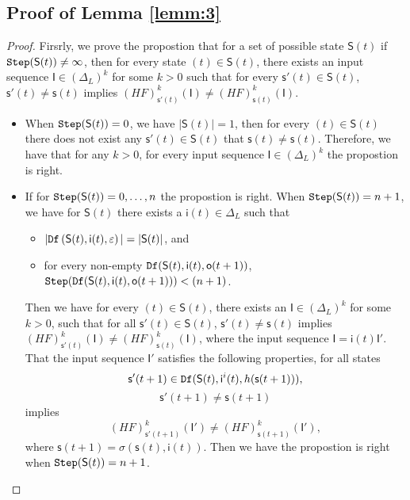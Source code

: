 \begin{appendices}
\subsection{Proof of Lemma \ref{lemm:3}}
\begin{proof} Firsrly, we prove the propostion that for a set of possible state $\mathsf{S}(t)$ if ${\tt Step}(\mathsf{S}(t))\ne\infty$, then for every state \State$(t)\in \mathsf{S}(t)$, there exists an input sequence $\mathsf{I}\in(\Delta_L)^{k}$ for some $k >0$ such that for every $\mathsf{s}'(t)\in \mathsf{S}(t)$, $\mathsf{s}'(t)\neq \mathsf{s}(t)$ implies $(HF)^{k}_{\mathsf{s}'(t)}(\mathsf{I})\neq (HF)^{k}_{{\mathsf{s}(t)}}(\mathsf{I})$.
\begin{itemize}
\item When ${\tt Step}(\mathsf{S}(t))=0$, we have $|\mathsf{S}(t)|=1$, then for every \State$(t)$$\in \mathsf{S}(t)$ there does not exist any $\mathsf{s}'(t)\in \mathsf{S}(t)$ that $\mathsf{s}(t)\neq \mathsf{s}(t)$. Therefore, we have that for any $k >0$, for every input sequence $\mathsf{I}\in(\Delta_L)^{k}$ the propostion is right. 
\item If for ${\tt Step}(\mathsf{S}(t))=0,\ldots, n$ the propostion is right. When ${\tt Step}(\mathsf{S}(t))=n+1$, we have for $\mathsf{S}(t)$ there exists a $\mathsf{i}(t)\in \Delta_L$ such that
 \begin{itemize}
 \item  $|{\tt Df}\left(\mathsf{S}(t),\mathsf{i}(t),\varepsilon\right)|=|\mathsf{S}(t)|$, and 
 \item  for every non-empty ${\tt Df}(\mathsf{S}(t),\mathsf{i}(t),\mathsf{o}(t+1))$, ${\tt Step}({\tt Df}(\mathsf{S}(t),\mathsf{i}(t),\mathsf{o}(t+1)))<(n+1)$.
 \end{itemize}
 Then we have for every \State$(t)$$\in \mathsf{S}(t)$, there exists an $\mathsf{I}\in(\Delta_L)^{k}$ for some $k >0$, such that for all $\mathsf{s}'(t)\in \mathsf{S}(t)$, $\mathsf{s}'(t)\neq \mathsf{s}(t)$ implies $(HF)^{k}_{\mathsf{s}'(t)}(\mathsf{I})\neq (HF)^{k}_{{\mathsf{s}(t)}}(\mathsf{I})$, where the input sequence $\mathsf{I}=\mathsf{i}(t)\mathsf{I}'$. That the input sequence $\mathsf{I}'$ satisfies the following properties,
  for all states \[\mathsf{s}'(t+1)\in {\tt Df}(\mathsf{S}(t),\mathsf{i}^{i}(t),h(\mathsf{s}(t+1))),\]\[\mathsf{s}'(t+1)\neq \mathsf{s}(t+1)\] implies \[(HF)^k_{\mathsf{s}'(t+1)}(\mathsf{I}')\neq (HF)^k_{{\mathsf{s}(t+1)}}(\mathsf{I}'),\] where $\mathsf{s}(t+1)=\sigma(\mathsf{s}(t),\mathsf{i}(t))$. Then we have the propostion is right when ${\tt Step}(\mathsf{S}(t))=n+1$. 


\end{itemize}
\end{proof}
\end{appendices}
